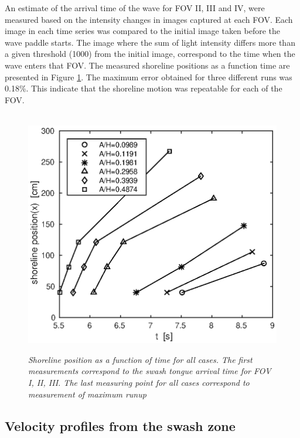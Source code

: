\documentclass[a4paper, 11pt, english, twoside, openright]{article}
\begin{document}
An estimate of the arrival time of the wave for FOV II, III and IV, were measured based on the intensity changes in images captured at each FOV.  Each image in each time series was compared to the initial image taken before the wave paddle starts. The image where the sum of light intensity differs more than a given threshold (1000) from the initial image, correspond to the time when the wave enters that FOV. The measured shoreline positions as a function time are presented in Figure \ref{fig:arr_tim}. The maximum error obtained for three different runs was 0.18\%. This indicate that the shoreline motion was repeatable for each of the FOV.
\begin{figure}
        \centering
        ~ %
                \includegraphics[scale=0.6]{./Figures/shoreline2015.eps}
                \caption{\textit{Shoreline position as a function of time for all cases. The first measurements correspond to the swash tongue arrival time for FOV I, II, III. The last measuring point for all cases correspond to measurement of maximum runup}}
              \label{fig:arr_tim}
      \end{figure}


\subsection{Velocity profiles from the swash zone}
\label{vel_pro}
\end{document}
